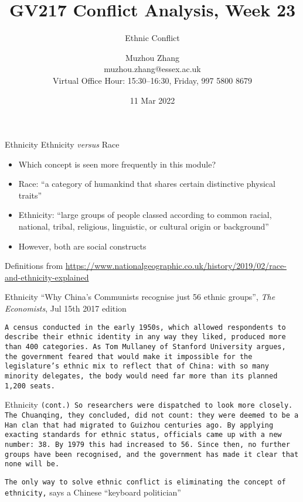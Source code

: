 \documentclass[handout]{beamer}
\title{GV217 Conflict Analysis, Week 23}
\subtitle{Ethnic Conflict}
\author{Muzhou Zhang\\ muzhou.zhang@essex.ac.uk\\ Virtual Office Hour: 15:30--16:30, Friday, 997 5800 8679}
\date{11 Mar 2022}
\begin{document}
\maketitle
{}

\begin{frame}{Ethnicity}
    \pause Ethnicity \textit{versus} Race
    \begin{itemize}
        \pause\item Which concept is seen more frequently in this module?
        \pause\item Race: ``a category of humankind that shares certain distinctive physical traits''
        \pause\item Ethnicity: ``large groups of people classed according to common racial, national, tribal, religious, linguistic, or cultural origin or background''
        \pause\item However, both are social constructs
    \end{itemize}
    \vfill
    \tiny Definitions from \url{https://www.nationalgeographic.co.uk/history/2019/02/race-and-ethnicity-explained}
\end{frame}

\begin{frame}{Ethnicity}
    \pause ``Why China's Communists recognise just 56 ethnic groups'', \textit{The Economists}, Jul 15th 2017 edition
    \vspace{30pt}

    \pause\texttt{\scriptsize A census conducted in the early 1950s, which allowed respondents to describe their ethnic identity in any way they liked, produced more than 400 categories. As Tom Mullaney of Stanford University argues, the government feared that would make it impossible for the legislature's ethnic mix to reflect that of China: with so many minority delegates, the body would need far more than its planned 1,200 seats.}
\end{frame}

\begin{frame}{Ethnicity}
    \pause\texttt{\scriptsize (cont.) So researchers were dispatched to look more closely. The Chuanqing, they concluded, did not count: they were deemed to be a Han clan that had migrated to Guizhou centuries ago. By applying exacting standards for ethnic status, officials came up with a new number: 38. By 1979 this had increased to 56. Since then, no further groups have been recognised, and the government has made it clear that none will be.}
    \vspace{15pt}

    \pause\texttt{The only way to solve ethnic conflict is eliminating the concept of ethnicity,} says a Chinese ``keyboard politician''
\end{frame}
\end{document}
